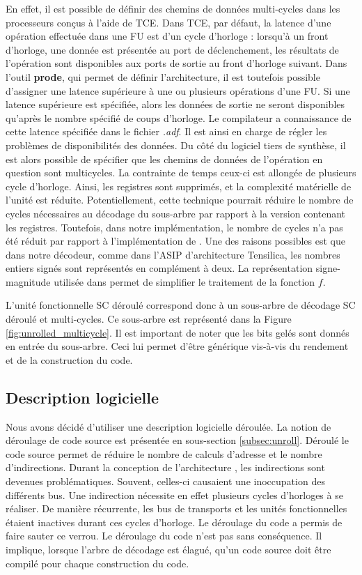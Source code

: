 En effet, il est possible de définir des chemins de données multi-cycles dans les processeurs conçus à l'aide de TCE. Dans TCE, par défaut, la latence d'une opération effectuée dans une FU est d'un cycle d'horloge : lorsqu'à un front d'horloge, une donnée est présentée au port de déclenchement, les résultats de l'opération sont disponibles aux ports de sortie au front d'horloge suivant. Dans l'outil \textbf{prode}, qui permet de définir l'architecture, il est toutefois possible d'assigner une latence supérieure à une ou plusieurs opérations d'une FU. Si une latence supérieure est spécifiée, alors les données de sortie ne seront disponibles qu'après le nombre spécifié de coups d'horloge. Le compilateur a connaissance de cette latence spécifiée dans le fichier \textit{.adf}. Il est ainsi en charge de régler les problèmes de disponibilités des données. Du côté du logiciel tiers de synthèse, il est alors possible de spécifier que les chemins de données de l'opération en question sont multicycles. La contrainte de temps ceux-ci est allongée de plusieurs cycle d'horloge. Ainsi, les registres sont supprimés, et la complexité matérielle de l'unité est réduite. Potentiellement, cette technique pourrait réduire le nombre de cycles nécessaires au décodage du sous-arbre par rapport à la version contenant les registres. Toutefois, dans notre implémentation, le nombre de cycles n'a pas été réduit par rapport à l'implémentation de \cite{gal_scalable_2016}. Une des raisons possibles est que dans notre décodeur, comme dans l'ASIP d'architecture Tensilica, les nombres entiers signés sont représentés en complément à deux. La représentation signe-magnitude utilisée dans \cite{gal_scalable_2016} permet de simplifier le traitement de la fonction $f$.

L'unité fonctionnelle \og SC déroulé \fg correspond donc à un sous-arbre de décodage SC déroulé et multi-cycles. Ce sous-arbre est représenté dans la Figure \ref{fig:unrolled_multicycle}. Il est important de noter que les bits gelés sont donnés en entrée du sous-arbre. Ceci lui permet d'être générique vis-à-vis du rendement et de la construction du code.

\subsection{Description logicielle}

Nous avons décidé d'utiliser une description logicielle déroulée. La notion de déroulage de code source est présentée en sous-section \ref{subsec:unroll}. Déroulé le code source permet de réduire le nombre de calculs d'adresse et le nombre d'indirections. Durant la conception de l'architecture \TTSC, les indirections sont devenues problématiques. Souvent, celles-ci causaient une inoccupation des différents bus. Une indirection nécessite en effet plusieurs cycles d'horloges à se réaliser. De manière récurrente, les bus de transports et les unités fonctionnelles étaient inactives durant ces cycles d'horloge. Le déroulage du code a permis de faire sauter ce verrou. Le déroulage du code n'est pas sans conséquence. Il implique, lorsque l'arbre de décodage est élagué, qu'un code source doit être compilé pour chaque construction du code.

